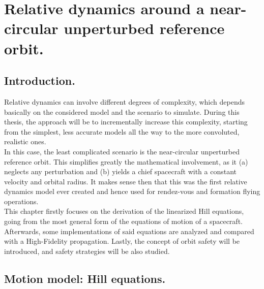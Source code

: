 \chapter{Relative dynamics around a near-circular unperturbed reference orbit.}
%
\label{chap:HCW}
%
\section{Introduction.}
%
\indent Relative dynamics can involve different degrees of complexity, which depends basically on the considered model and the scenario to simulate. During this thesis, the approach will be to incrementally increase this complexity, starting from the simplest, less accurate models all the way to the more convoluted, realistic ones. \\
%
\indent In this case, the least complicated scenario is the near-circular unperturbed reference orbit. This simplifies greatly the mathematical involvement, as it (a) neglects any perturbation and (b) yields a chief spacecraft with a constant velocity and orbital radius. It makes sense then that this was the first relative dynamics model ever created and hence used for rendez-vous and formation flying operations.\\
%
\indent This chapter firstly focuses on the derivation of the linearized Hill equations, going from the most general form of the equations of motion of a spacecraft. Afterwards, some implementations of said equations are analyzed and compared with a High-Fidelity propagation. Lastly, the concept of orbit safety will be introduced, and safety strategies will be also studied.
%
\section{Motion model: Hill equations.}
%
\indent
%
